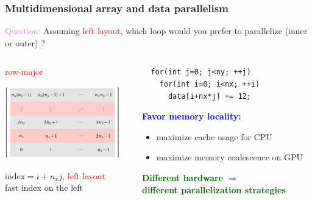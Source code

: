 \begin{frame}[fragile=singleslide]
  \frametitle{Multidimensional array and data parallelism}

  \begin{block}{}
    {\large \textcolor{violet}{Question:}
    Assuming \textcolor{red}{left layout}, which loop would you prefer to parallelize (inner or outer) ?}    
  \end{block}
  
  \begin{columns}
    \begin{column}{0.45\textwidth}
      \begin{center}
        \textcolor{red}{\large row-major}
        
        \includegraphics[width=5cm]{images/tikz/row-major}

        $\text{index} = i + n_x j$, \textcolor{red}{left layout}\\
        fast index on the left
      \end{center}
    \end{column}
    \begin{column}{0.48\textwidth}
\begin{verbatim}
  for(int j=0; j<ny; ++j)
    for(int i=0; i<nx; ++i)
      data[i+nx*j] += 12;
\end{verbatim}
\begin{center}
  \textcolor{blue}{\bf Favor memory locality:}
\end{center}
\begin{itemize}
\item maximize cache usage for CPU
\item maximize memory coalescence on GPU
\end{itemize}
\begin{center}
  \textcolor{darkgreen}{\bf Different hardware $\Rightarrow$ \\ different parallelization strategies}
\end{center}
\end{column}
    \hfill
  \end{columns}
\end{frame}

